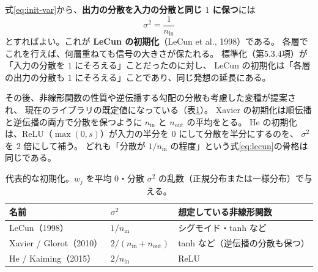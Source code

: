 式\eqref{eq:init-var}から、\textbf{出力の分散を入力の分散と同じ $1$ に保つ}には
\begin{equation}
  \sigma^2 = \frac{1}{n_{\text{in}}}
  \label{eq:lecun}
\end{equation}
とすればよい。これが \textbf{LeCun の初期化}（LeCun et al., 1998）である。
各層でこれを行えば、何層重ねても信号の大きさが保たれる。
標準化（第5.3.4項）が「入力の分散を $1$ にそろえる」ことだったのに対し、
LeCun の初期化は「各層の出力の分散も $1$ にそろえる」ことであり、同じ発想の延長にある。

その後、非線形関数の性質や逆伝播する勾配の分散も考慮した変種が提案され、
現在のライブラリの既定値になっている（表\ref{tab:init}）。
Xavier の初期化は順伝播と逆伝播の両方で分散を保つように $n_{\text{in}}$ と $n_{\text{out}}$ の平均をとる。
He の初期化は、ReLU（$\max(0, s)$）が入力の半分を $0$ にして分散を半分にするのを、
$\sigma^2$ を $2$ 倍にして補う。
どれも「分散が $1/n_{\text{in}}$ の程度」という式\eqref{eq:lecun}の骨格は同じである。

\begin{table}[H]
  \centering
  \caption{代表的な初期化。$w_j$ を平均 $0$・分散 $\sigma^2$ の乱数（正規分布または一様分布）で与える。}
  \label{tab:init}
  \begin{tabular}{l|l|l}
    \hline
    名前 & $\sigma^2$ & 想定している非線形関数 \\
    \hline\hline
    LeCun（1998） & $1/n_{\text{in}}$ & シグモイド・tanh など \\
    Xavier / Glorot（2010） & $2/(n_{\text{in}} + n_{\text{out}})$ & tanh など（逆伝播の分散も保つ） \\
    He / Kaiming（2015） & $2/n_{\text{in}}$ & ReLU \\
    \hline
  \end{tabular}
\end{table}


